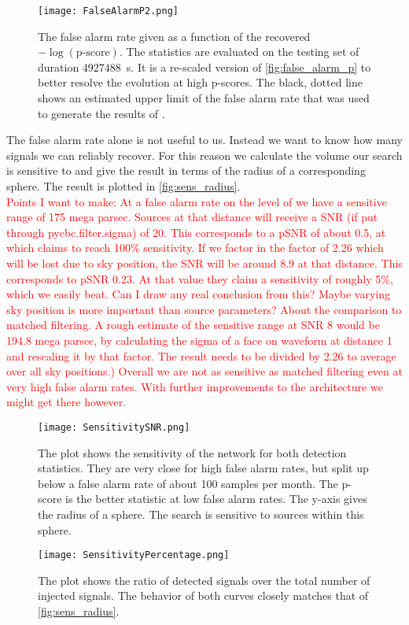 \begin{figure}
\centering
\texttt{[image: FalseAlarmP2.png]}
\caption[False alarm rate for p-score log-scale]{The false alarm rate given as a function of the recovered $-\log(\text{p-score})$. The statistics are evaluated on the testing set of duration \SI{4927488}{\s}. It is a re-scaled version of \autoref{fig:false_alarm_p} to better resolve the evolution at high p-scores. The black, dotted line shows an estimated upper limit of the false alarm rate that was used to generate the results of \cite{bns_network}.}\label{fig:false_alarm_p_log}
\end{figure}

\noindent The false alarm rate alone is not useful to us. Instead we want to know how many signals we can reliably recover. For this reason we calculate the volume our search is sensitive to and give the result in terms of the radius of a corresponding sphere. The result is plotted in \autoref{fig:sens_radius}.\\
\textcolor{red}{Points I want to make: At a false alarm rate on the level of \cite{bns_network} we have a sensitive range of 175 mega parsec. Sources at that distance will receive a SNR (if put through pycbc.filter.sigma) of 20. This corresponds to a pSNR of about 0.5, at which \cite{bns_network} claims to reach 100\% sensitivity. If we factor in the factor of 2.26 which will be lost due to sky position, the SNR will be around 8.9 at that distance. This corresponds to pSNR 0.23. At that value they claim a sensitivity of roughly 5\%, which we easily beat. Can I draw any real conclusion from this? Maybe varying sky position is more important than source parameters? About the comparison to matched filtering. A rough estimate of the sensitive range at SNR 8 would be 194.8 mega parsec, by calculating the sigma of a face on waveform at distance 1 and rescaling it by that factor. The result needs to be divided by 2.26 to average over all sky positions.) Overall we are not as sensitive as matched filtering even at very high false alarm rates. With further improvements to the architecture we might get there however.}
\begin{figure}
\centering
\texttt{[image: SensitivitySNR.png]}
\caption[Sensitivie volume]{The plot shows the sensitivity of the network for both detection statistics. They are very close for high false alarm rates, but split up below a false alarm rate of about 100 samples per month. The p-score is the better statistic at low false alarm rates. The y-axis gives the radius of a sphere. The search is sensitive to sources within this sphere.}\label{fig:sens_radius}
\end{figure}
\begin{figure}
\centering
\texttt{[image: SensitivityPercentage.png]}
\caption[Sensitivity as ratio]{The plot shows the ratio of detected signals over the total number of injected signals. The behavior of both curves closely matches that of \autoref{fig:sens_radius}.}
\end{figure}
